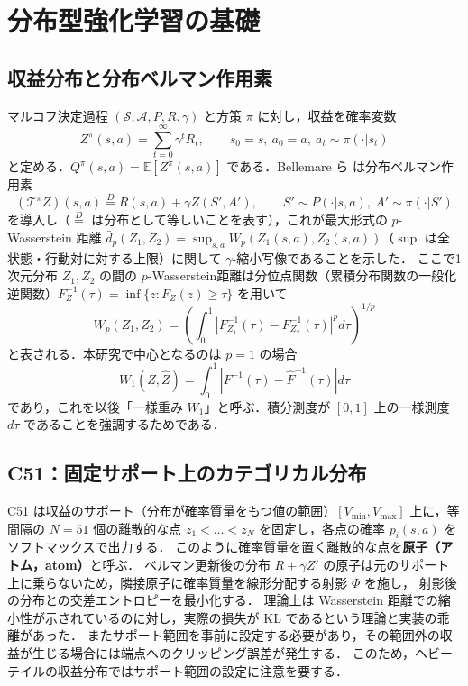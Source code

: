 \documentclass[a4paper,10pt]{jsarticle}
\theoremstyle{definition}
\newcommand{\Wone}{W_1}
\newcommand{\Finv}{F^{-1}}
\newcommand{\Fhinv}{\hat{F}^{-1}}
\newcommand{\E}{\mathbb{E}}
\begin{document}
\section{分布型強化学習の基礎}
\label{sec:drl}

\subsection{収益分布と分布ベルマン作用素}
マルコフ決定過程 $(\mathcal{S},\mathcal{A},P,R,\gamma)$ と方策 $\pi$ に対し，収益を確率変数
\begin{equation}
  Z^\pi(s,a)=\sum_{t=0}^{\infty}\gamma^t R_t,\qquad s_0=s,\ a_0=a,\ a_t\sim\pi(\cdot|s_t)
\end{equation}
と定める．$Q^\pi(s,a)=\E[Z^\pi(s,a)]$ である．Bellemare ら \cite{bellemare2017c51} は分布ベルマン作用素
\begin{equation}
  (\mathcal{T}^\pi Z)(s,a)\overset{D}{=}R(s,a)+\gamma Z(S',A'),\qquad S'\sim P(\cdot|s,a),\ A'\sim\pi(\cdot|S')
\end{equation}
を導入し（$\overset{D}{=}$ は分布として等しいことを表す），これが最大形式の $p$-Wasserstein 距離 $\bar d_p(Z_1,Z_2)=\sup_{s,a}W_p(Z_1(s,a),Z_2(s,a))$（$\sup$ は全状態・行動対に対する上限）に関して
$\gamma$-縮小写像であることを示した．
ここで1次元分布 $Z_1,Z_2$ の間の $p$-Wasserstein距離は分位点関数（累積分布関数の一般化逆関数）$F^{-1}_{Z}(\tau)=\inf\{z:F_Z(z)\ge\tau\}$ を用いて
\begin{equation}
  W_p(Z_1,Z_2)=\left(\int_0^1\left|F_{Z_1}^{-1}(\tau)-F_{Z_2}^{-1}(\tau)\right|^p d\tau\right)^{1/p}
  \label{eq:wp}
\end{equation}
と表される．本研究で中心となるのは $p=1$ の場合
\begin{equation}
  \Wone(Z,\hat Z)=\int_0^1\left|\Finv(\tau)-\Fhinv(\tau)\right|d\tau
  \label{eq:w1}
\end{equation}
であり，これを以後「一様重み $\Wone$」と呼ぶ．積分測度が $[0,1]$ 上の一様測度 $d\tau$ であることを強調するためである．

\subsection{C51：固定サポート上のカテゴリカル分布}
C51 \cite{bellemare2017c51} は収益のサポート（分布が確率質量をもつ値の範囲）$[V_{\min},V_{\max}]$ 上に，等間隔の $N=51$ 個の離散的な点
$z_1<\dots<z_N$ を固定し，各点の確率 $p_i(s,a)$ をソフトマックスで出力する．
このように確率質量を置く離散的な点を\textbf{原子（アトム，atom）}と呼ぶ．
ベルマン更新後の分布 $R+\gamma Z'$ の原子は元のサポート上に乗らないため，隣接原子に確率質量を線形分配する射影 $\Phi$ を施し，
射影後の分布との交差エントロピーを最小化する．
理論上は Wasserstein 距離での縮小性が示されているのに対し，実際の損失が KL であるという理論と実装の乖離があった．
またサポート範囲を事前に設定する必要があり，その範囲外の収益が生じる場合には端点へのクリッピング誤差が発生する．
このため，ヘビーテイルの収益分布ではサポート範囲の設定に注意を要する．
\end{document}
